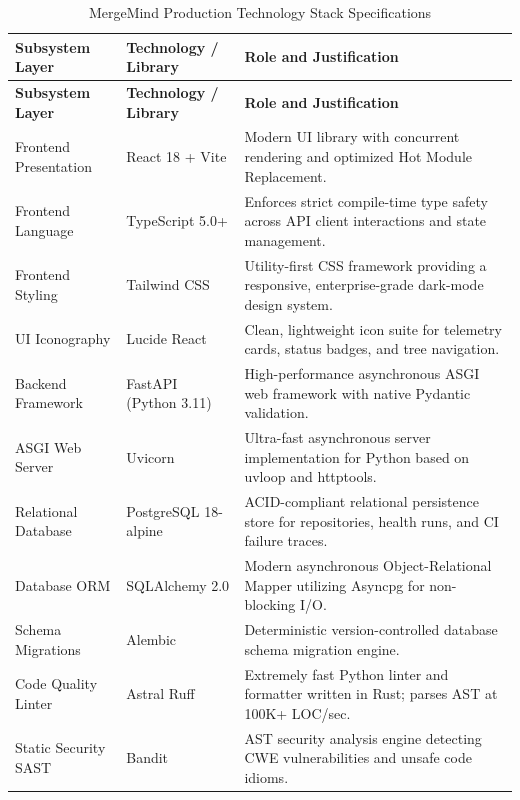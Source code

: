 \documentclass[12pt,a4paper,oneside]{report}
\begin{document}
\begin{longtable}{p{} p{} p{}}
\caption{MergeMind Production Technology Stack Specifications} \label{tab:app-tech-stack} \\
\toprule
\textbf{Subsystem Layer} & \textbf{Technology / Library} & \textbf{Role and Justification} \\
\midrule
\endfirsthead
\toprule
\textbf{Subsystem Layer} & \textbf{Technology / Library} & \textbf{Role and Justification} \\
\midrule
\endhead
\bottomrule
\endfoot
\bottomrule
\endlastfoot

Frontend Presentation & React 18 + Vite & Modern UI library with concurrent rendering and optimized Hot Module Replacement. \\
\addlinespace
Frontend Language & TypeScript 5.0+ & Enforces strict compile-time type safety across API client interactions and state management. \\
\addlinespace
Frontend Styling & Tailwind CSS & Utility-first CSS framework providing a responsive, enterprise-grade dark-mode design system. \\
\addlinespace
UI Iconography & Lucide React & Clean, lightweight icon suite for telemetry cards, status badges, and tree navigation. \\
\addlinespace
Backend Framework & FastAPI (Python 3.11) & High-performance asynchronous ASGI web framework with native Pydantic validation. \\
\addlinespace
ASGI Web Server & Uvicorn & Ultra-fast asynchronous server implementation for Python based on uvloop and httptools. \\
\addlinespace
Relational Database & PostgreSQL 18-alpine & ACID-compliant relational persistence store for repositories, health runs, and CI failure traces. \\
\addlinespace
Database ORM & SQLAlchemy 2.0 & Modern asynchronous Object-Relational Mapper utilizing Asyncpg for non-blocking I/O. \\
\addlinespace
Schema Migrations & Alembic & Deterministic version-controlled database schema migration engine. \\
\addlinespace
Code Quality Linter & Astral Ruff & Extremely fast Python linter and formatter written in Rust; parses AST at 100K+ LOC/sec. \\
\addlinespace
Static Security SAST & Bandit & AST security analysis engine detecting CWE vulnerabilities and unsafe code idioms. \\

\end{longtable}
\end{document}
